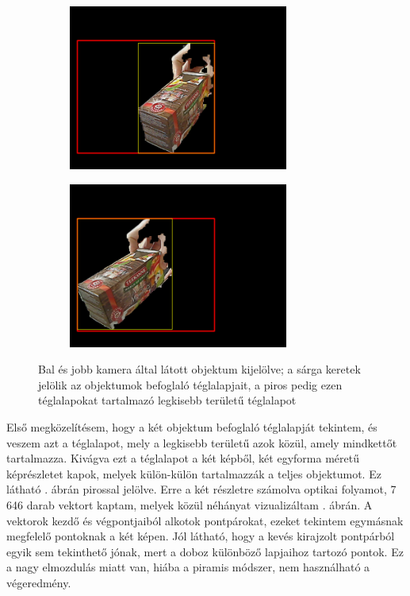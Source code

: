 \begin{figure}[tbh]
\centering
\begin{subfigure}[b]{.49\linewidth}
	\centering
	\includegraphics[width=205pt]{figures/of_img_left_framed.png}
  \end{subfigure}
\begin{subfigure}[b]{.49\linewidth}
	\centering
	\includegraphics[width=205pt]{figures/of_img_right_framed.png}
  \end{subfigure}
\caption{Bal és jobb kamera által látott objektum kijelölve; a sárga keretek jelölik az objektumok befoglaló téglalapjait, a piros pedig ezen téglalapokat tartalmazó legkisebb területű téglalapot \label{fig:of_original}}
\end{figure}

Első megközelítésem, hogy a két objektum befoglaló téglalapját tekintem, és veszem azt a téglalapot, mely a legkisebb területű azok közül, amely mindkettőt tartalmazza. Kivágva ezt a téglalapot a két képből, két egyforma méretű képrészletet kapok, melyek külön-külön tartalmazzák a teljes objektumot. Ez látható . ábrán pirossal jelölve. Erre a két részletre számolva optikai folyamot, 7 646 darab vektort kaptam, melyek közül néhányat vizualizáltam . ábrán. A vektorok kezdő és végpontjaiból alkotok pontpárokat, ezeket tekintem egymásnak megfelelő pontoknak a két képen. Jól látható, hogy a kevés kirajzolt pontpárból egyik sem tekinthető jónak, mert a doboz különböző lapjaihoz tartozó pontok. Ez a nagy elmozdulás miatt van, hiába a piramis módszer, nem használható a végeredmény.

